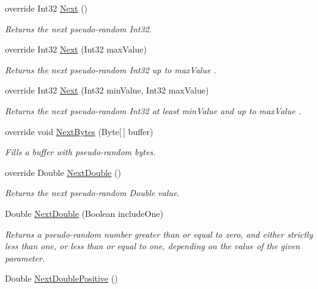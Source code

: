 \begin{DoxyCompactItemize}
override Int32 \hyperlink{class_u_m_t_1_1_mersenne_twister_af7c3a3d4b93537fbd72385518831000a}{Next} ()
\begin{DoxyCompactList}\small\item\em Returns the next pseudo-\/random Int32. \end{DoxyCompactList}\item 
override Int32 \hyperlink{class_u_m_t_1_1_mersenne_twister_a27a85323408740c511d5e71f887df796}{Next} (Int32 max\+Value)
\begin{DoxyCompactList}\small\item\em Returns the next pseudo-\/random Int32 up to {\itshape max\+Value} . \end{DoxyCompactList}\item 
override Int32 \hyperlink{class_u_m_t_1_1_mersenne_twister_a6e3aec9cc93283cfa10e896320f2d4c3}{Next} (Int32 min\+Value, Int32 max\+Value)
\begin{DoxyCompactList}\small\item\em Returns the next pseudo-\/random Int32 at least {\itshape min\+Value}  and up to {\itshape max\+Value} . \end{DoxyCompactList}\item 
override void \hyperlink{class_u_m_t_1_1_mersenne_twister_a33c4f7a3b84aecc1d7d3fb7ef198ac8b}{Next\+Bytes} (Byte\mbox{[}$\,$\mbox{]} buffer)
\begin{DoxyCompactList}\small\item\em Fills a buffer with pseudo-\/random bytes. \end{DoxyCompactList}\item 
override Double \hyperlink{class_u_m_t_1_1_mersenne_twister_a29216ecb75ec2fee71cb7542e1ffb5ab}{Next\+Double} ()
\begin{DoxyCompactList}\small\item\em Returns the next pseudo-\/random Double value. \end{DoxyCompactList}\item 
Double \hyperlink{class_u_m_t_1_1_mersenne_twister_a35074f09a2ce3c28af7683c360495de6}{Next\+Double} (Boolean include\+One)
\begin{DoxyCompactList}\small\item\em Returns a pseudo-\/random number greater than or equal to zero, and either strictly less than one, or less than or equal to one, depending on the value of the given parameter. \end{DoxyCompactList}\item 
Double \hyperlink{class_u_m_t_1_1_mersenne_twister_af663fc97c8f89da2c7484f2160bdd087}{Next\+Double\+Positive} ()

\end{DoxyCompactItemize}
